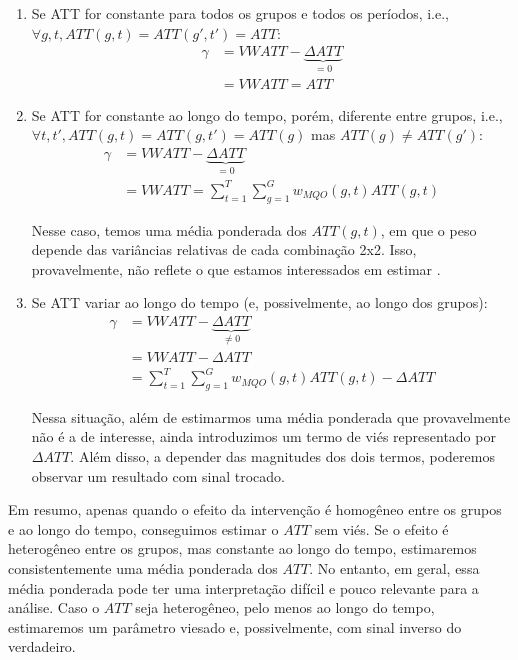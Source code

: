 \documentclass[portugues]{article}
\begin{document}
\begin{enumerate}
    \item Se ATT for constante para todos os grupos e todos os períodos, i.e., $\forall g,t, ATT(g,t) = ATT(g',t') = ATT$:
        \[\begin{split}
            \gamma &= VWATT - \underbrace{\Delta ATT}_{=0} \\
            & = VWATT = ATT
        \end{split}\]

    \item Se ATT for constante ao longo do tempo, porém, diferente entre grupos, i.e., $\forall t,t',  ATT(g,t) = ATT(g,t') = ATT(g)$ mas $ATT(g) \neq ATT(g')$:
        \[\begin{split}
            \gamma &= VWATT - \underbrace{\Delta ATT}_{=0} \\
            & = VWATT = \sum_{t=1}^{T} \sum_{g = 1}^{G} w_{MQO}(g,t) ATT(g,t)
        \end{split}\]

       \noindent Nesse caso, temos uma média ponderada dos $ATT(g,t)$, em que o peso depende das variâncias relativas de cada combinação 2x2. Isso, provavelmente, não reflete o que estamos interessados em estimar \citep{goodman2021difference, callaway2021difference}.

    \item Se ATT variar ao longo do tempo (e, possivelmente, ao longo dos grupos):
        \[\begin{split}
            \gamma &= VWATT - \underbrace{\Delta ATT}_{\neq 0} \\
            & = VWATT - \Delta ATT \\
            &= \sum_{t=1}^{T} \sum_{g = 1}^{G}  w_{MQO}(g,t) ATT(g,t) - \Delta ATT
        \end{split}\]

        \noindent Nessa situação, além de estimarmos uma média ponderada que provavelmente não é a de interesse, ainda introduzimos um termo de viés representado por $\Delta ATT$. Além disso, a depender das magnitudes dos dois termos, poderemos observar um resultado com sinal trocado.
    
\end{enumerate} 

Em resumo, apenas quando o efeito da intervenção é homogêneo entre os grupos e ao longo do tempo, conseguimos estimar o $ATT$ sem viés. Se o efeito é heterogêneo entre os grupos, mas constante ao longo do tempo, estimaremos consistentemente uma média ponderada dos $ATT$. No entanto, em geral, essa média ponderada pode ter uma interpretação difícil e pouco relevante para a análise. Caso o $ATT$ seja heterogêneo, pelo menos ao longo do tempo, estimaremos um parâmetro viesado e, possivelmente, com sinal inverso do verdadeiro.
\end{document}
